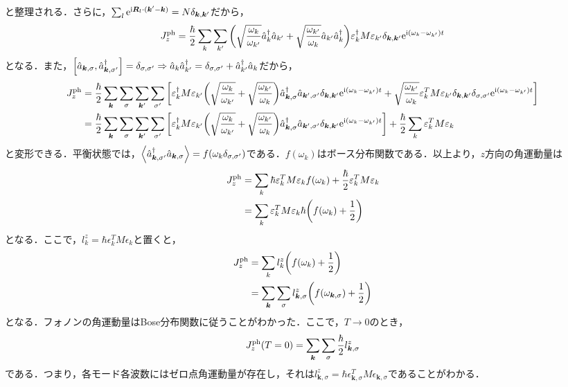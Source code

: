 \documentclass{report}
\begin{document}
と整理される．さらに，$\sum_l \mathrm{e}^{\mathrm{i}\bm{R}_l\cdot(\bm{k}' - \bm{k})} = N\delta_{\bm{k},\bm{k}'}$だから，
\begin{align}
  J_z^{\mathrm{ph}} = \frac{\hbar}{2} \sum_{k}\sum_{k'} \qty(\sqrt{\frac{\omega_k}{\omega_{k'}}} \hat{a}_k^\dagger\hat{a}_{k'} + \sqrt{\frac{\omega_{k'}}{\omega_k}}\hat{a}_{k'}\hat{a}_k^\dagger) \varepsilon_k^\dagger M \varepsilon_{k'} \delta_{\bm{k},\bm{k}'}\mathrm{e}^{\mathrm{i}(\omega_k - \omega_{k'})t}
\end{align}
となる．また，$\qty[\hat{a}_{\bm{k},\sigma},\hat{a}_{\bm{k},\sigma'}^{\dagger}] = \delta_{\sigma,\sigma'}\Rightarrow\hat{a}_k\hat{a}_{k'}^{\dagger}= \delta_{\sigma,\sigma'} + \hat{a}_{k'}^{\dagger}\hat{a}_k$だから，
\begin{align}
  J_z^{\mathrm{ph}} &= \frac{\hbar}{2} \sum_{\bm{k}}\sum_{\sigma}\sum_{\bm{k}'}\sum_{\sigma'} \qty[ \varepsilon_k^\dagger M \varepsilon_{k'} \qty(\sqrt{\frac{\omega_k}{\omega_{k'}}} + \sqrt{\frac{\omega_{k'}}{\omega_k}}) \hat{a}_{\bm{k},\sigma}^\dagger\hat{a}_{\bm{k}',\sigma'}\delta_{\bm{k},\bm{k}'} \mathrm{e}^{\mathrm{i}(\omega_k - \omega_{k'})t} + \sqrt{\frac{\omega_{k'}}{\omega_k}} \varepsilon_k^T M \varepsilon_{k'} \delta_{\bm{k},\bm{k}'}\delta_{\sigma,\sigma'} \mathrm{e}^{\mathrm{i}(\omega_k - \omega_{k'})t} ]\\
  &= \frac{\hbar}{2} \sum_{\bm{k}}\sum_{\sigma}\sum_{\bm{k}'}\sum_{\sigma'} \qty[ \varepsilon_k^\dagger M \varepsilon_{k'} \qty(\sqrt{\frac{\omega_k}{\omega_{k'}}} + \sqrt{\frac{\omega_{k'}}{\omega_k}}) \hat{a}_{\bm{k},\sigma}^\dagger\hat{a}_{\bm{k}',\sigma'}\delta_{\bm{k},\bm{k}'} \mathrm{e}^{\mathrm{i}(\omega_k - \omega_{k'})t} ] +\frac{\hbar}{2}\sum_{k} \varepsilon_k^T M \varepsilon_{k}\\
\end{align}
と変形できる．平衡状態では，$\ev{\hat{a}^\dagger_{\bm{k},\sigma'}\hat{a}_{\bm{k},\sigma}} = f(\omega_k\delta_{\sigma,\sigma'})$である．$f(\omega_k)$はボース分布関数である．以上より，$z$方向の角運動量は
\begin{align}
  J_z^{\mathrm{ph}} &= \sum_{k} \hbar \varepsilon_k^T M \varepsilon_k f(\omega_k) + \frac{\hbar}{2} \varepsilon_k^T M \varepsilon_k\\
  &= \sum_{k} \varepsilon_k^T M \varepsilon_k \hbar \qty(f(\omega_k) + \frac{1}{2})
\end{align}
となる．ここで，$l_{k}^z = \hbar \epsilon_k^T M \epsilon_k$と置くと，
\begin{align}
  J_z^{\mathrm{ph}} &= \sum_{k} l_{k}^z\qty(f(\omega_k) + \frac{1}{2})\\
  &= \sum_{\bm{k}}\sum_{\sigma} l_{\bm{k},\sigma}^z \qty(f(\omega_{\bm{k},\sigma}) + \frac{1}{2}) \label{angular-phonon}
\end{align}
となる．フォノンの角運動量はBose分布関数に従うことがわかった．ここで，$T\to0$のとき，
\begin{align}
  J_z^{\mathrm{ph}}(T=0) = \sum_{\bm{k}}\sum_{\sigma} \frac{\hbar}{2} l_{\bm{k},\sigma}^{z}
\end{align}
である．つまり，各モード各波数にはゼロ点角運動量が存在し，それは$l_{\bm{k},\sigma}^z = \hbar \epsilon_{\bm{k},\sigma}^T M \epsilon_{\bm{k},\sigma}$であることがわかる．
\end{document}
